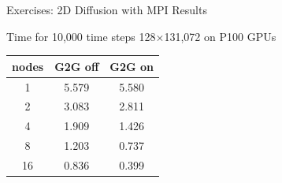 \documentclass[aspectratio=43]{beamer}
\begin{document}
\begin{frame}[fragile]{Exercises: 2D Diffusion with MPI Results}
    \begin{info}{Time for 10,000 time steps \@ 128$\times$131,072 on P100 GPUs}
       \begin{center}
           \begin{tabular}{ccc}
               \hline
               nodes   &   G2G off & G2G on \\
                \hline
               1       &  5.579    &  5.580 \\
               2       &  3.083    &  2.811 \\
               4       &  1.909    &  1.426 \\
               8       &  1.203    &  0.737 \\
              16       &  0.836    &  0.399 \\
           \end{tabular}
       \end{center}
   \end{info}
\end{frame}
\end{document}
